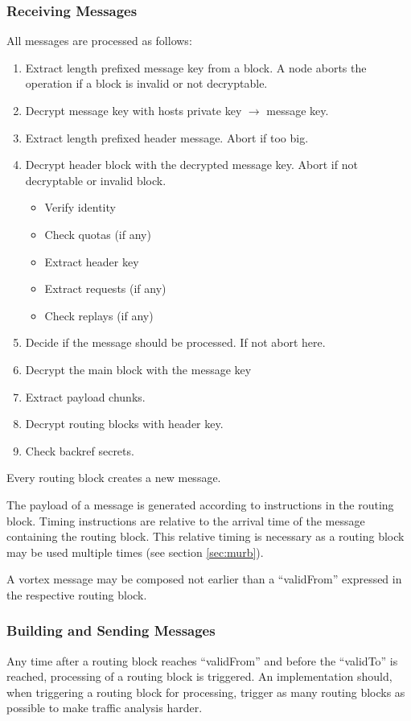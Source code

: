 \subsubsection{Receiving Messages}
All messages are processed as follows:
\begin{enumerate}
	\item Extract length prefixed message key from a block. A node aborts the operation if a block is invalid or not decryptable.
	\item Decrypt message key with hosts private key $\rightarrow$ message key.
	\item Extract length prefixed header message. Abort if too big.
	\item Decrypt header block with the decrypted message key. Abort if not decryptable or invalid block.
	\begin{itemize}
		\item Verify identity
		\item Check quotas (if any)
		\item Extract header key
		\item Extract requests (if any)
		\item Check replays (if any)
	\end{itemize}
	\item Decide if the message should be processed. If not abort here.
	\item Decrypt the main block with the message key
	\item Extract payload chunks.
	\item Decrypt routing blocks with header key.
	\item Check backref secrets.
\end{enumerate}

Every routing block creates a new message.

The payload of a message is generated according to instructions in the routing block. Timing instructions are relative to the arrival time of the message containing the routing block. This relative timing is necessary as a routing block may be used multiple times (see section \ref{sec:murb}).

A vortex message may be composed not earlier than a ``validFrom'' expressed in the respective routing block.

\subsubsection{Building and Sending Messages}
Any time after a routing block reaches ``validFrom'' and before the ``validTo'' is reached, processing of a routing block is triggered. An implementation should, when triggering a routing block for processing, trigger as many routing blocks as possible to make traffic analysis harder.

